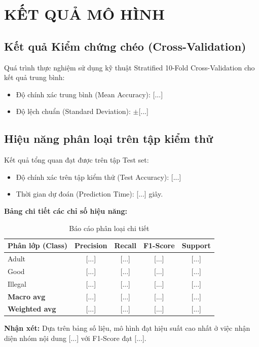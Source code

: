 \documentclass[a4paper,12pt]{report}
\begin{document}
\chapter{KẾT QUẢ MÔ HÌNH}

\section{Kết quả Kiểm chứng chéo (Cross-Validation)}
Quá trình thực nghiệm sử dụng kỹ thuật Stratified 10-Fold Cross-Validation cho kết quả trung bình:
\begin{itemize}
    \item Độ chính xác trung bình (Mean Accuracy): [...]
    \item Độ lệch chuẩn (Standard Deviation): $\pm$[...]
\end{itemize}

\section{Hiệu năng phân loại trên tập kiểm thử}
Kết quả tổng quan đạt được trên tập Test set:
\begin{itemize}
    \item Độ chính xác trên tập kiểm thử (Test Accuracy): [...]
    \item Thời gian dự đoán (Prediction Time): [...] giây.
\end{itemize}

\textbf{Bảng chi tiết các chỉ số hiệu năng:}

\begin{table}[H]
    \centering
    \begin{tabular}{|l|c|c|c|c|}
    \hline
    \textbf{Phân lớp (Class)} & \textbf{Precision} & \textbf{Recall} & \textbf{F1-Score} & \textbf{Support} \\ \hline
    Adult & [...] & [...] & [...] & [...] \\ \hline
    Good & [...] & [...] & [...] & [...] \\ \hline
    Illegal & [...] & [...] & [...] & [...] \\ \hline
    \textbf{Macro avg} & [...] & [...] & [...] & [...] \\ \hline
    \textbf{Weighted avg} & [...] & [...] & [...] & [...] \\ \hline
    \end{tabular}
    \caption{Báo cáo phân loại chi tiết}
\end{table}

\textbf{Nhận xét:} Dựa trên bảng số liệu, mô hình đạt hiệu suất cao nhất ở việc nhận diện nhóm nội dung [...] với F1-Score đạt [...].
\end{document}
